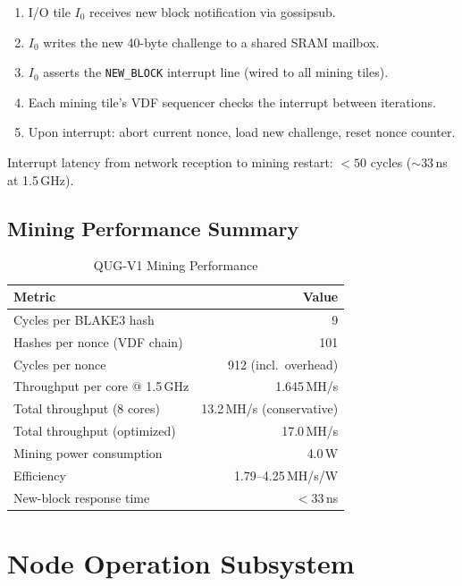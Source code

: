 \documentclass[11pt,a4paper]{article}
\begin{document}
\begin{enumerate}
    \item I/O tile $I_0$ receives new block notification via gossipsub.
    \item $I_0$ writes the new 40-byte challenge to a shared SRAM mailbox.
    \item $I_0$ asserts the \texttt{NEW\_BLOCK} interrupt line (wired to all mining tiles).
    \item Each mining tile's VDF sequencer checks the interrupt between iterations.
    \item Upon interrupt: abort current nonce, load new challenge, reset nonce counter.
\end{enumerate}

Interrupt latency from network reception to mining restart: $< 50$ cycles ($\sim$33\,ns at 1.5\,GHz).

\subsection{Mining Performance Summary}

\begin{table}[H]
\centering
\caption{QUG-V1 Mining Performance}
\begin{tabular}{@{}lr@{}}
\toprule
\textbf{Metric} & \textbf{Value} \\
\midrule
Cycles per BLAKE3 hash & 9 \\
Hashes per nonce (VDF chain) & 101 \\
Cycles per nonce & 912 (incl.\ overhead) \\
Throughput per core @ 1.5\,GHz & 1.645\,MH/s \\
Total throughput (8 cores) & 13.2\,MH/s (conservative) \\
Total throughput (optimized) & 17.0\,MH/s \\
Mining power consumption & 4.0\,W \\
Efficiency & 1.79--4.25\,MH/s/W \\
New-block response time & $<$33\,ns \\
\bottomrule
\end{tabular}
\end{table}

\section{Node Operation Subsystem}
\label{sec:node}
\end{document}
